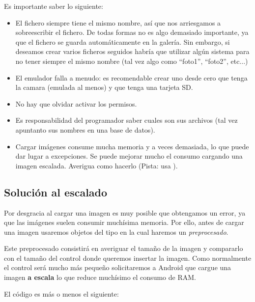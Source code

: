 \documentclass[a4paper,12pt,spanish]{sphinxmanual}
\begin{document}
Es importante saber lo siguiente:
\begin{itemize}
\item {} 
El fichero siempre tiene el mismo nombre, así que nos arriesgamos a sobreescribir el fichero. De todas formas no es algo demasiado importante, ya que el fichero se guarda automáticamente en la galería. Sin embargo, si deseamos crear varios ficheros seguidos habría que utilizar algún sistema para no tener siempre el mismo nombre (tal vez algo como ``foto1'', ``foto2'', etc...)

\item {} 
El emulador falla a menudo: es recomendable crear uno desde cero que tenga la camara (emulada al menos) y que tenga una tarjeta SD.

\item {} 
No hay que olvidar activar los permisos.

\item {} 
Es responsabilidad del programador saber cuales son sus archivos (tal vez apuntanto sus nombres en una base de datos).

\item {} 
Cargar imágenes consume mucha memoria y a veces demasiada, lo que puede dar lugar a excepciones. Se puede mejorar mucho el consumo cargando una imagen escalada. Averigua como hacerlo (Pista: usa ).

\end{itemize}


\subsection{Solución al escalado}
\label{tema2:solucion-al-escalado}
Por desgracia al cargar una imagen es muy posible que obtengamos un error, ya que las imágenes suelen consumir muchísima memoria. Por ello, antes de cargar una imagen usaremos objetos del tipo  en la cual haremos un \emph{preprocesado}.

Este preprocesado consistirá en averiguar el tamaño de la imagen y compararlo con el tamaño del control donde queremos insertar la imagen. Como normalmente el control será mucho más pequeño solicitaremos a Android que cargue una imagen \textbf{a escala} lo que reduce muchísimo el consumo de RAM.

El código es más o menos el siguiente:
\end{document}
